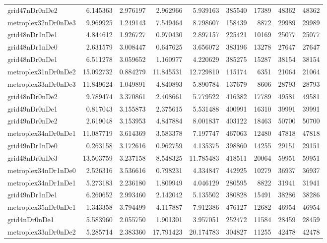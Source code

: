 \documentclass[../../../thesis.tex]{subfiles}
\begin{document}
\begin{longtable}{|l|r|r|r|r|r|r|r|r|}
grid47nDr0nDe2 & 6.145363 & 2.976197 & 2.962966 & 5.939163 & 385540 & 17389 & 48362 & 48362 \\
metroplex32nDr0nDe3 & 9.969925 & 1.249143 & 7.549464 & 8.798607 & 158439 & 8872 & 29989 & 29989 \\
grid48nDr1nDe1 & 4.844612 & 1.926727 & 0.970430 & 2.897157 & 225421 & 10169 & 25077 & 25077 \\
grid48nDr1nDe0 & 2.631579 & 3.008447 & 0.647625 & 3.656072 & 383196 & 13278 & 27647 & 27647 \\
grid48nDr0nDe1 & 6.511278 & 3.059652 & 1.160977 & 4.220629 & 385275 & 15287 & 38154 & 38154 \\
metroplex31nDr0nDe2 & 15.092732 & 0.884279 & 11.845531 & 12.729810 & 115174 & 6351 & 21064 & 21064 \\
metroplex33nDr0nDe3 & 11.849624 & 1.049891 & 4.840893 & 5.890784 & 137679 & 8606 & 28793 & 28793 \\
grid48nDr0nDe2 & 9.789474 & 3.370861 & 2.408661 & 5.779522 & 416382 & 17789 & 49581 & 49581 \\
grid49nDr0nDe1 & 0.817043 & 3.155873 & 2.375615 & 5.531488 & 400991 & 16310 & 39991 & 39991 \\
grid49nDr0nDe2 & 2.619048 & 3.153953 & 4.847884 & 8.001837 & 403122 & 18463 & 50700 & 50700 \\
metroplex34nDr0nDe1 & 11.087719 & 3.614369 & 3.583378 & 7.197747 & 467063 & 12480 & 47818 & 47818 \\
grid49nDr1nDe0 & 0.263158 & 3.172616 & 0.962759 & 4.135375 & 398860 & 14255 & 29151 & 29151 \\
grid48nDr0nDe3 & 13.503759 & 3.237158 & 8.548325 & 11.785483 & 418511 & 20064 & 59951 & 59951 \\
metroplex34nDr1nDe0 & 2.526316 & 3.536616 & 0.798231 & 4.334847 & 442925 & 10279 & 36937 & 36937 \\
metroplex34nDr1nDe1 & 5.273183 & 2.236180 & 1.809949 & 4.046129 & 280595 & 8822 & 31941 & 31941 \\
grid49nDr1nDe1 & 6.260652 & 2.993460 & 2.142042 & 5.135502 & 380828 & 15491 & 38286 & 38286 \\
metroplex35nDr0nDe1 & 1.343358 & 3.794499 & 4.117887 & 7.912386 & 476127 & 12682 & 46954 & 46954 \\
grid4nDr0nDe1 & 5.583960 & 2.055750 & 1.901301 & 3.957051 & 252472 & 11584 & 28459 & 28459 \\
metroplex33nDr0nDe2 & 5.285714 & 2.383360 & 17.791423 & 20.174783 & 304827 & 11255 & 42478 & 42478 \\

\end{longtable}
\end{document}
